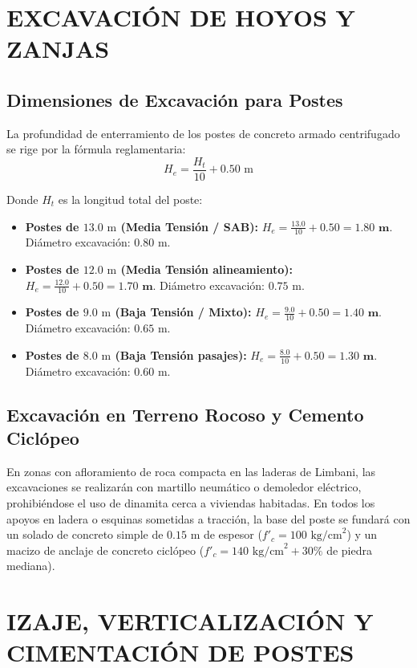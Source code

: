 \section{EXCAVACIÓN DE HOYOS Y ZANJAS}

\subsection{Dimensiones de Excavación para Postes}
La profundidad de enterramiento de los postes de concreto armado centrifugado se rige por la fórmula reglamentaria:
$$H_e = \frac{H_t}{10} + 0.50\text{ m}$$

Donde $H_t$ es la longitud total del poste:
\begin{itemize}
  \item \textbf{Postes de $13.0\text{ m}$ (Media Tensión / SAB):} $H_e = \frac{13.0}{10} + 0.50 = \mathbf{1.80\text{ m}}$. Diámetro excavación: $0.80\text{ m}$.
  \item \textbf{Postes de $12.0\text{ m}$ (Media Tensión alineamiento):} $H_e = \frac{12.0}{10} + 0.50 = \mathbf{1.70\text{ m}}$. Diámetro excavación: $0.75\text{ m}$.
  \item \textbf{Postes de $9.0\text{ m}$ (Baja Tensión / Mixto):} $H_e = \frac{9.0}{10} + 0.50 = \mathbf{1.40\text{ m}}$. Diámetro excavación: $0.65\text{ m}$.
  \item \textbf{Postes de $8.0\text{ m}$ (Baja Tensión pasajes):} $H_e = \frac{8.0}{10} + 0.50 = \mathbf{1.30\text{ m}}$. Diámetro excavación: $0.60\text{ m}$.
\end{itemize}

\subsection{Excavación en Terreno Rocoso y Cemento Ciclópeo}
En zonas con afloramiento de roca compacta en las laderas de Limbani, las excavaciones se realizarán con martillo neumático o demoledor eléctrico, prohibiéndose el uso de dinamita cerca a viviendas habitadas. En todos los apoyos en ladera o esquinas sometidas a tracción, la base del poste se fundará con un solado de concreto simple de $0.15\text{ m}$ de espesor ($f'_c = 100\text{ kg/cm}^2$) y un macizo de anclaje de concreto ciclópeo ($f'_c = 140\text{ kg/cm}^2 + 30\%$ de piedra mediana).

\section{IZAJE, VERTICALIZACIÓN Y CIMENTACIÓN DE POSTES}

